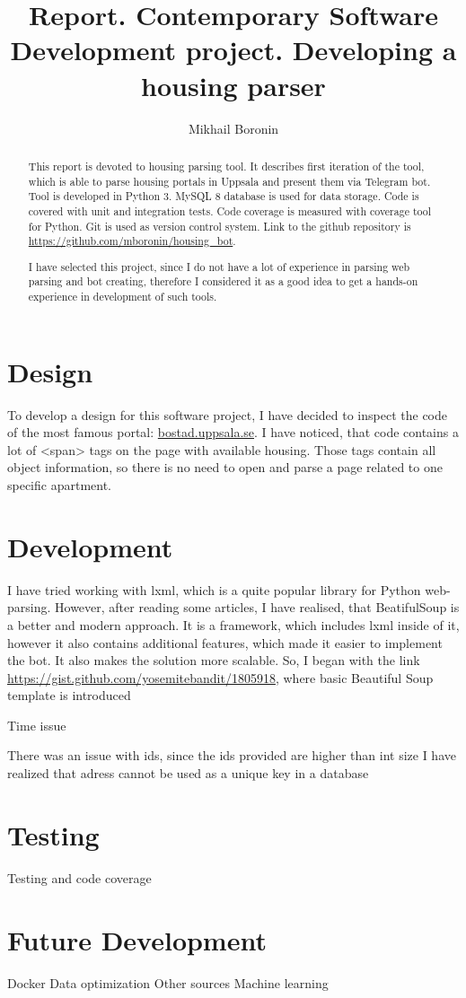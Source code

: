 \documentclass[a4paper,11pt]{article}
\title{Report. Contemporary Software Development project. Developing a housing parser}
\author{Mikhail Boronin}
\begin{document}
\maketitle
\tableofcontents

\begin{abstract}
This report is devoted to housing parsing tool. It describes first iteration of the tool, which is able to parse housing portals in Uppsala and present them via Telegram bot.
Tool is developed in Python 3. MySQL 8 database is used for data storage. 
Code is covered with unit and integration tests. Code coverage is measured with coverage tool for Python.
Git is used as version control system. Link to the github repository is \url{https://github.com/mboronin/housing_bot}.

I have selected this project, since I do not have a lot of experience in parsing web parsing and bot creating, therefore I considered it as a good idea to get a hands-on experience in development of such tools.
\end{abstract}

\section{Design}
To develop a design for this software project, I have decided to inspect the code of the most famous portal: \url{bostad.uppsala.se}. I have noticed, that code contains a lot of <span> tags on the page with available housing. Those tags contain all object information, so there is no need to open and parse a page related to one specific apartment.


\section{Development}
I have tried working with lxml, which is a quite popular library for Python web-parsing.
However, after reading some articles, I have realised, that BeatifulSoup is a better and modern approach. It is a framework, which includes lxml inside of it, however it also contains additional features, which made it easier to implement the bot. It also makes the solution more scalable.
So, I began with the link \url{https://gist.github.com/yosemitebandit/1805918}, where basic Beautiful Soup template is introduced

Time issue

There was an issue with ids, since the ids provided are higher than int size
I have realized that adress cannot be used as a unique key in a database

\section{Testing}
Testing and code coverage

\section{Future Development}
Docker
Data optimization
Other sources
Machine learning
\end{document}
